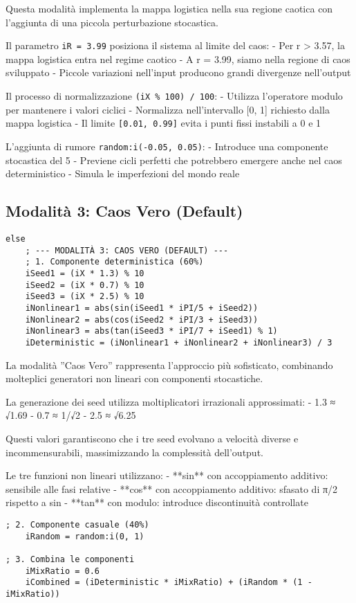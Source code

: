 Questa modalità implementa la mappa logistica nella sua regione caotica con l'aggiunta di una piccola perturbazione stocastica.

Il parametro \texttt{iR = 3.99} posiziona il sistema al limite del caos:
- Per r > 3.57, la mappa logistica entra nel regime caotico
- A r = 3.99, siamo nella regione di caos sviluppato
- Piccole variazioni nell'input producono grandi divergenze nell'output

Il processo di normalizzazione \texttt{(iX \% 100) / 100}:
- Utilizza l'operatore modulo per mantenere i valori ciclici
- Normalizza nell'intervallo [0, 1] richiesto dalla mappa logistica
- Il limite \texttt{[0.01, 0.99]} evita i punti fissi instabili a 0 e 1

L'aggiunta di rumore \texttt{random:i(-0.05, 0.05)}:
- Introduce una componente stocastica del 5%
- Previene cicli perfetti che potrebbero emergere anche nel caos deterministico
- Simula le imperfezioni del mondo reale
\subsection{Modalità 3: Caos Vero (Default)}
\begin{lstlisting}[language=Csound]
else
    ; --- MODALITÀ 3: CAOS VERO (DEFAULT) ---
    ; 1. Componente deterministica (60%)
    iSeed1 = (iX * 1.3) % 10
    iSeed2 = (iX * 0.7) % 10
    iSeed3 = (iX * 2.5) % 10
    iNonlinear1 = abs(sin(iSeed1 * iPI/5 + iSeed2))
    iNonlinear2 = abs(cos(iSeed2 * iPI/3 + iSeed3))
    iNonlinear3 = abs(tan(iSeed3 * iPI/7 + iSeed1) % 1)
    iDeterministic = (iNonlinear1 + iNonlinear2 + iNonlinear3) / 3
\end{lstlisting}

La modalità ''Caos Vero'' rappresenta l'approccio più sofisticato, combinando molteplici generatori non lineari con componenti stocastiche.

La generazione dei seed utilizza moltiplicatori irrazionali approssimati:
- 1.3 ≈ √1.69 
- 0.7 ≈ 1/√2
- 2.5 ≈ √6.25

Questi valori garantiscono che i tre seed evolvano a velocità diverse e incommensurabili, massimizzando la complessità dell'output.

Le tre funzioni non lineari utilizzano:
- **sin** con accoppiamento additivo: sensibile alle fasi relative
- **cos** con accoppiamento additivo: sfasato di π/2 rispetto a sin
- **tan** con modulo: introduce discontinuità controllate

\begin{lstlisting}[language=Csound]
    ; 2. Componente casuale (40%)
    iRandom = random:i(0, 1)

; 3. Combina le componenti
    iMixRatio = 0.6
    iCombined = (iDeterministic * iMixRatio) + (iRandom * (1 - iMixRatio))
\end{lstlisting}

